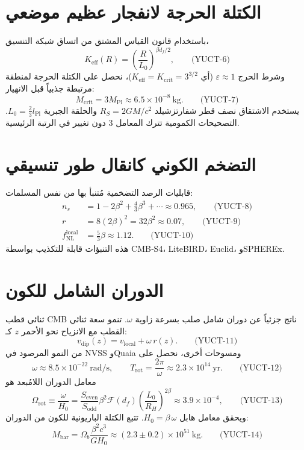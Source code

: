 \documentclass[12pt,a4paper]{article}
\newcommand{\Keff}{K_{\mathrm{eff}}}
\newcommand{\betaf}{\beta}
\newcommand{\Lpl}{l_{\mathrm{Pl}}}
\newcommand{\Sodd}{S_{\mathrm{odd}}}
\newcommand{\Seven}{S_{\mathrm{even}}}
\newcommand{\Lzero}{L_0}
\newcommand{\Mbar}{M_{\mathrm{bar}}}
\begin{document}
	\section{الكتلة الحرجة لانفجار عظيم موضعي}
	
	باستخدام قانون القياس المشتق من اتساق شبكة التنسيق،
	\[
	\Keff(R) = \left(\frac{R}{\Lzero}\right)^{\betaf d_f/2}, \qquad\text{(YUCT-6)}
	\]
	وشرط الحرج \(\varepsilon \approx 1\) (أي \(\Keff = K_{\mathrm{crit}} = 3^{3/2}\))، نحصل على الكتلة الحرجة لمنطقة مرتبطة جذبياً قبل الانهيار:
	\[
	M_{\mathrm{crit}} = 3 M_{\mathrm{Pl}} \approx 6.5\times 10^{-8}\ \mathrm{kg}. \qquad\text{(YUCT-7)}
	\]
	يستخدم الاشتقاق نصف قطر شفارتزشيلد \(R_S = 2GM/c^2\) والحلقة الجبرية \(\Lzero = \frac{2}{3}\Lpl\). التصحيحات الكمومية تترك المعامل 3 دون تغيير في الرتبة الرئيسية.
	
	\section{التضخم الكوني كانقال طور تنسيقي}
	
	قابليات الرصد التضخمية مُتنبأ بها من نفس المسلمات:
	\begin{align}
		n_s &= 1 - 2\betaf^2 + \frac{4}{3}\betaf^3 + \cdots \approx 0.965, \qquad\text{(YUCT-8)}\\
		r &= 8(2\betaf)^2 = 32\betaf^2 \approx 0.07, \qquad\text{(YUCT-9)}\\
		f_{\mathrm{NL}}^{\mathrm{local}} &= \frac{5}{3}\betaf \approx 1.12. \qquad\text{(YUCT-10)}
	\end{align}
	هذه التنبؤات قابلة للتكذيب بواسطة CMB‑S4، LiteBIRD، Euclid، وSPHEREx.
	
	\section{الدوران الشامل للكون}
	
	ثنائي قطب CMB ناتج جزئياً عن دوران شامل صلب بسرعة زاوية \(\omega\). تنمو سعة ثنائي القطب مع الانزياح نحو الأحمر \(z\) كـ:
	\[
	v_{\mathrm{dip}}(z) = v_{\mathrm{local}} + \omega\, r(z). \qquad\text{(YUCT-11)}
	\]
	من النمو المرصود في NVSS وQuaia ومسوحات أخرى، نحصل على
	\[
	\omega \approx 8.5\times 10^{-22}\ \mathrm{rad/s},\qquad
	T_{\mathrm{rot}} = \frac{2\pi}{\omega} \approx 2.3\times 10^{14}\ \mathrm{yr}. \qquad\text{(YUCT-12)}
	\]
	معامل الدوران اللامُبعد هو
	\[
	\Omega_{\mathrm{rot}} \equiv \frac{\omega}{H_0} = \frac{\Seven}{\Sodd} \betaf^2 \mathcal{F}(d_f)\left(\frac{L_0}{R_H}\right)^{2\betaf} \approx 3.9\times 10^{-4}, \qquad\text{(YUCT-13)}
	\]
	ويحقق معامل هابل \(H_0 = \betaf\,\omega\). تتبع الكتلة الباريونية للكون من الدوران:
	\[
	\Mbar = \Omega_b\frac{\betaf^2 c^3}{G H_0} \approx (2.3\pm 0.2)\times 10^{51}\ \mathrm{kg}. \qquad\text{(YUCT-14)}
	\]
	
\end{document}
